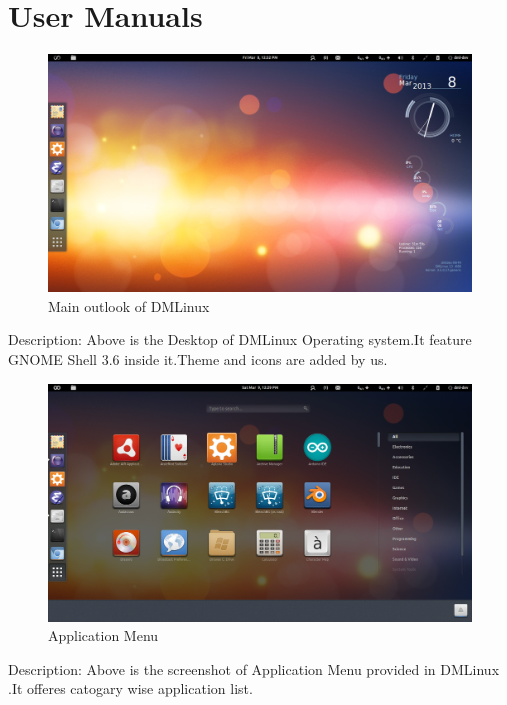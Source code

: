 \chapter{User Manuals}

\begin{figure}[h]
\begin{center}
  \includegraphics[scale=0.33] {1.png}
  \caption[Screenshot - DMLinux Main Desktop]{Main outlook of DMLinux}
\end{center}
\end{figure}
Description: Above is the Desktop of DMLinux Operating system.It feature GNOME Shell 3.6 inside it.Theme and icons are added by us.

\newpage
\begin{figure}[h]
\begin{center}
  \includegraphics[scale=0.33] {2.png}
  \caption[Screenshot - Application Menu]{Application Menu}
\end{center}
\end{figure}
Description: Above is the screenshot of Application Menu provided in DMLinux .It offeres catogary wise application list.

